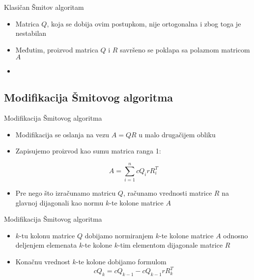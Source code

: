 \documentclass[serbian]{beamer}
\begin{document}
\begin{frame}{Klasičan Šmitov algoritam}
	
	\begin{itemize}
		\item Matrica $Q$, koja se dobija ovim postupkom, nije ortogonalna i zbog toga je nestabilan
		\item Međutim, proizvod matrica $Q$ i $R$ savršeno se poklapa sa polaznom matricom $A$
		\item 
	\end{itemize}
	
\end{frame}

\subsection{Modifikacija Šmitovog algoritma}
\begin{frame}{Modifikacija Šmitovog algoritma}

	\begin{itemize}
		\item Modifikacija se oslanja na vezu $A = QR$ u malo drugačijem obliku
		\item Zapisujemo proizvod kao sumu matrica ranga 1:
		
		$$A = \sum_{i=1}^{n} cQ_irR_i^T $$
		
		\item Pre nego što izračunamo matricu $Q$, računamo vrednosti matrice $R$ na glavnoj dijagonali kao normu $k$-te kolone matrice $A$	
	\end{itemize}

\end{frame}

\begin{frame}{Modifikacija Šmitovog algoritma}

	\begin{itemize}
		\item $k$-tu kolonu matrice $Q$ dobijamo normiranjem $k$-te kolone matrice $A$ odnosno deljenjem elemenata $k$-te kolone $k$-tim elementom dijagonale matrice $R$
		\item Konačnu vrednost $k$-te kolone dobijamo formulom
		$$cQ_k = cQ_{k-1} - cQ_{k-1}rR_k^T$$	
	\end{itemize}
\end{frame}
\end{document}
